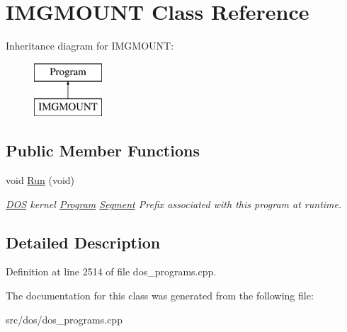 \hypertarget{classIMGMOUNT}{\section{I\-M\-G\-M\-O\-U\-N\-T Class Reference}
\label{classIMGMOUNT}
}
Inheritance diagram for I\-M\-G\-M\-O\-U\-N\-T\-:\begin{figure}[H]
\begin{center}
\leavevmode
\includegraphics[height=2.000000cm]{classIMGMOUNT}
\end{center}
\end{figure}
\subsection*{Public Member Functions}
\begin{DoxyCompactItemize}
\item 
\hypertarget{classIMGMOUNT_abd99efa1dffda2e6f5640ebcd4781852}{void \hyperlink{classIMGMOUNT_abd99efa1dffda2e6f5640ebcd4781852}{Run} (void)}\label{classIMGMOUNT_abd99efa1dffda2e6f5640ebcd4781852}

\begin{DoxyCompactList}\small\item\em \hyperlink{classDOS}{D\-O\-S} kernel \hyperlink{classProgram}{Program} \hyperlink{structSegment}{Segment} Prefix associated with this program at runtime. \end{DoxyCompactList}\end{DoxyCompactItemize}


\subsection{Detailed Description}


Definition at line 2514 of file dos\-\_\-programs.\-cpp.



The documentation for this class was generated from the following file\-:\begin{DoxyCompactItemize}
\item 
src/dos/dos\-\_\-programs.\-cpp\end{DoxyCompactItemize}
